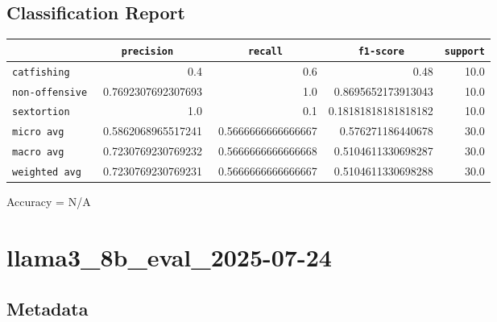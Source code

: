 \documentclass{article}
\begin{document}
\subsection{Classification Report}

\begin{center}
\begin{tabular}{l | r | r | r | r} \hline
    \verb|            | & \verb|    precision     | & \verb|      recall      | & \verb|     f1-score     | & \verb|support| \\ \hline
    \hline
    \verb|catfishing | & 0.4 & 0.6 & 0.48 &    10.0 \\ \hline
    \verb|non-offensive| & 0.7692307692307693 & 1.0 & 0.8695652173913043 &    10.0 \\ \hline
    \verb|sextortion | & 1.0 & 0.1 & 0.18181818181818182 &    10.0 \\ \hline
    \verb|micro avg  | & 0.5862068965517241 & 0.5666666666666667 & 0.576271186440678 &    30.0 \\ \hline
    \verb|macro avg  | & 0.7230769230769232 & 0.5666666666666668 & 0.5104611330698287 &    30.0 \\ \hline
    \verb|weighted avg| & 0.7230769230769231 & 0.5666666666666667 & 0.5104611330698288 &    30.0 \\ \hline
\end{tabular}
\end{center}

\begin{center}
Accuracy = N/A
\end{center}

\section{llama3\_8b\_eval\_2025-07-24}
\subsection{Metadata}
\end{document}
